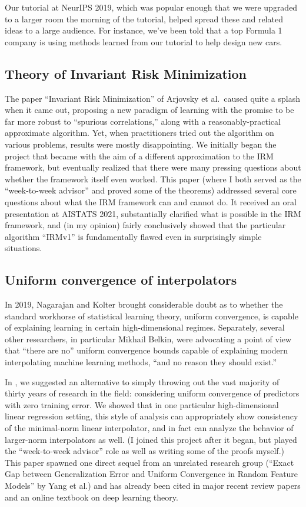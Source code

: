 \documentclass[12pt]{article}
\begin{document}
Our tutorial at NeurIPS 2019, which was popular enough that we were upgraded to a larger room the morning of the tutorial, helped spread these and related ideas to a large audience. For instance, we've been told that a top Formula 1 company is using methods learned from our tutorial to help design new cars.


\subsection{Theory of Invariant Risk Minimization}
The paper ``Invariant Risk Minimization'' of Arjovsky et al.\ caused quite a splash when it came out, proposing a new paradigm of learning with the promise to be far more robust to ``spurious correlations,'' along with a reasonably-practical approximate algorithm. Yet, when practitioners tried out the algorithm on various problems, results were mostly disappointing. We initially began the project that became \cite{kamath:irm} with the aim of a different approximation to the IRM framework, but eventually realized that there were many pressing questions about whether the framework itself even worked. This paper (where I both served as the ``week-to-week advisor'' and proved some of the theorems) addressed several core questions about what the IRM framework can and cannot do. It received an oral presentation at AISTATS 2021, substantially clarified what is possible in the IRM framework, and (in my opinion) fairly conclusively showed that the particular algorithm ``IRMv1'' is fundamentally flawed even in surprisingly simple situations.


\subsection{Uniform convergence of interpolators}
In 2019, Nagarajan and Kolter brought considerable doubt as to whether the standard workhorse of statistical learning theory, uniform convergence, is capable of explaining learning in certain high-dimensional regimes. Separately, several other researchers, in particular Mikhail Belkin, were advocating a point of view that ``there are no'' uniform convergence bounds capable of explaining modern interpolating machine learning methods, ``and no reason they should exist.''

In \cite{zhou:uniform-interpolation}, we suggested an alternative to simply throwing out the vast majority of thirty years of research in the field: considering uniform convergence of predictors with zero training error. We showed that in one particular high-dimensional linear regression setting, this style of analysis can appropriately show consistency of the minimal-norm linear interpolator, and in fact can analyze the behavior of larger-norm interpolators as well. (I joined this project after it began, but played the ``week-to-week advisor'' role as well as writing some of the proofs myself.) This paper spawned one direct sequel from an unrelated research group (``Exact Gap between Generalization Error and Uniform Convergence in Random Feature Models'' by Yang et al.) and has already been cited in major recent review papers and an online textbook on deep learning theory.
\end{document}
